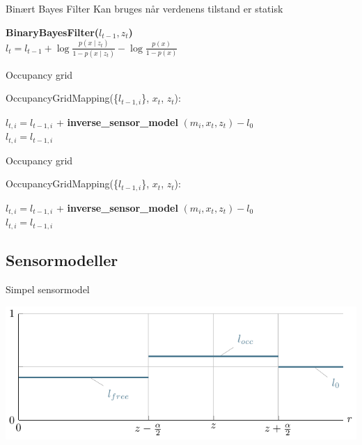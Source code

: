 \begin{frame}{Binært Bayes Filter}
Kan bruges når verdenens tilstand er statisk

\begin{algorithm}[H]
\textbf{BinaryBayesFilter($l_{t-1}, z_t$)} \\
\Indp $l_t = l_{t-1} + \log \frac{p(x \mid z_t)}{1-p(x \mid z_t)} - \log \frac{p(x)}{1-p(x)}$ \\
\end{algorithm}
\end{frame}

\begin{frame}{Occupancy grid}
\begin{algorithm}[H]
OccupancyGridMapping(\{$l_{t-1,i}$\}, $x_t$, $z_t$):

{
{ $ l_{t,i} = l_{t-1,i} $ + \textbf{inverse\_sensor\_model} $( m_i, x_t, z_t ) - l_0$\\ }
{ $ l_{t,i} = l_{t-1,i}  $\\ }
}
\end{algorithm}
\end{frame}

\begin{frame}{Occupancy grid}
\begin{algorithm}[H]
OccupancyGridMapping(\{$l_{t-1,i}$\}, $x_t$, $z_t$):

{
{ $ l_{t,i} = l_{t-1,i} $ + \textbf{inverse\_sensor\_model} $( m_i, x_t, z_t ) - l_0$\\ }
{ $ l_{t,i} = l_{t-1,i}  $\\ }
}
\end{algorithm}
\end{frame}

\subsection{Sensormodeller}
\begin{frame}{Simpel sensormodel}

\includegraphics{simple_sensormodel.pdf}
\end{frame}

